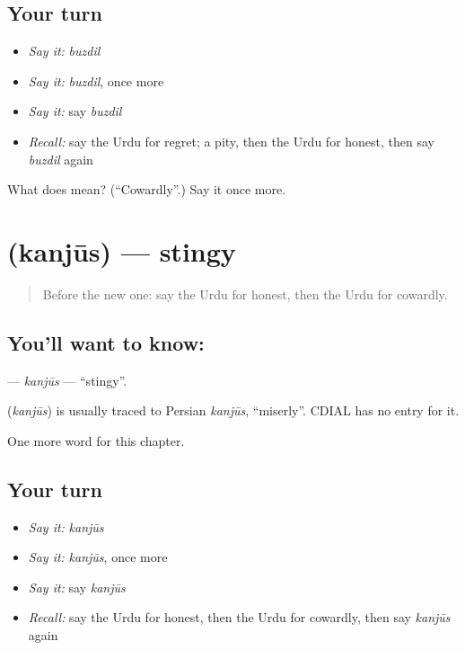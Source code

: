 \subsection*{Your turn}
\begin{itemize}
\raggedright
  \item \emph{Say it:} \emph{buzdil}
  \item \emph{Say it:} \emph{buzdil}, once more
  \item \emph{Say it:} say \emph{buzdil}
  \item \emph{Recall:} say the Urdu for regret; a pity, then the Urdu for honest, then say \emph{buzdil} again
\end{itemize}

\begin{tcolorbox}[breakable,colback=teal!4,colframe=teal!35!black,title={Before you move on}]
What does  mean? (\textquotedblleft{}Cowardly\textquotedblright{}.) Say it once more.
\end{tcolorbox}
\section[\texorpdfstring{\ur{کنجوس} (kanjūs)}{کنجوس (kanjūs)}]{ (kanjūs) — stingy}

\label{lesson:UR-C193-kanjus}



\begin{quote}
Before the new one: say the Urdu for honest, then the Urdu for cowardly.
\end{quote}

\subsection*{You'll want to know: }
\textbf{} — \emph{kanjūs} — \textquotedblleft{}stingy\textquotedblright{}.

\begin{cousinweb}
\textbf{} (\emph{kanjūs}) is usually traced to Persian \emph{kanjūs}, \textquotedblleft{}miserly\textquotedblright{}. CDIAL has no entry for it.
\end{cousinweb}

\begin{grammarlens}[title={What you've built}]
One more word for this chapter.
\end{grammarlens}

\subsection*{Your turn}
\begin{itemize}
\raggedright
  \item \emph{Say it:} \emph{kanjūs}
  \item \emph{Say it:} \emph{kanjūs}, once more
  \item \emph{Say it:} say \emph{kanjūs}
  \item \emph{Recall:} say the Urdu for honest, then the Urdu for cowardly, then say \emph{kanjūs} again
\end{itemize}

